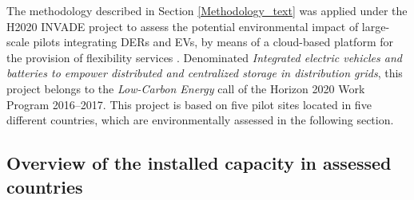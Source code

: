 {The methodology described in Section \ref{Methodology_text} was applied under the H2020 INVADE project to assess the potential environmental impact of large-scale pilots integrating DERs and EVs, by means of a cloud-based platform for {the provision of flexibility services}%
. Denominated \textit{Integrated electric vehicles and batteries to empower distributed and centralized storage in distribution grids}, this project belongs to the  \textit{Low-Carbon Energy} call of the Horizon 2020 Work Program 2016--2017. This project is based on five pilot sites located in five different countries, which are  environmentally assessed in the following section.  %

\subsection{Overview of the installed capacity in assessed countries} 

}

